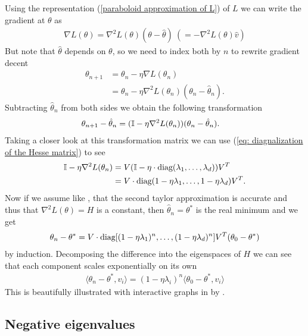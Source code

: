 Using the representation (\ref{paraboloid approximation of L}) of \(L\) we
can write the gradient at \(\theta\) as
%
\begin{align*}
	\nabla L(\theta)
	=  \nabla^2 L(\theta)(\theta-\hat{\theta})
	\ (= -\nabla^2 L(\theta)\hat{v})
\end{align*}
%
But note that \(\hat{\theta}\) depends on \(\theta\), so we need to index both
by \(n\) to rewrite gradient decent
%
\begin{align*}
	\theta_{n+1} &= \theta_n - \eta\nabla L(\theta_n)\\
	&= \theta_n - \eta\nabla^2 L(\theta_n)(\theta_n - \hat{\theta}_n).
\end{align*}
%
Subtracting \(\hat{\theta}_n\) from both sides we obtain the following
transformation 
%
\begin{align*}
	\theta_{n+1} - \hat{\theta}_n
	&= (\mathbb{I} - \eta\nabla^2 L(\theta_n) ) (\theta_n - \hat{\theta}_n).
\end{align*}
%
Taking a closer look at this transformation matrix we can use (\ref{eq:
diagnalization of the Hesse matrix}) to see
%
\begin{align*}
	\mathbb{I} - \eta\nabla^2 L(\theta_n)
	&= V(\mathbb{I} - \eta\cdot\text{diag}(\lambda_1,\dots,\lambda_d) )V^T \\
	&= V\cdot\text{diag}(1-\eta\lambda_1, \dots,1-\eta\lambda_d)V^T.
\end{align*}
%
Now if we assume like \textcite{gohWhyMomentumReally2017}, that the second
taylor approximation is accurate and thus that \(\nabla^2 L(\theta)=H\) is a
constant, then \(\hat{\theta}_n = \theta^*\) is the real minimum and we get
%
\begin{align}
	\theta_n - \theta^*
	= V\cdot\text{diag}[(1-\eta\lambda_1)^n,\dots,(1-\eta\lambda_d)^n] V^T (\theta_0 - \theta^*)
\end{align}
%
by induction. Decomposing the difference into the eigenspaces of \(H\) we can 
see that each component scales exponentially on its own 
%
\begin{align*}
	\langle \theta_n -\theta^*, v_i\rangle
	= (1-\eta\lambda_i)^n \langle \theta_0 - \theta^*, v_i\rangle
\end{align*}
%
This is beautifully illustrated with interactive graphs in
 by \citeauthor{gohWhyMomentumReally2017}.

\subsection{Negative eigenvalues}

